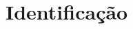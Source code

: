 \documentclass[12pt,a4paper]{article}
\begin{document}



\newpage%
\section{Identificação}



\newpage%






\end{document}
